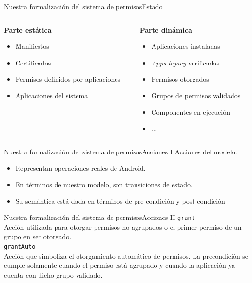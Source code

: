 \documentclass[pdf, handout]{beamer} %
\begin{document}
\begin{frame}{Nuestra formalización del sistema de permisos}{Estado}
    \begin{columns}[T]
        \begin{column}{.45\textwidth}
            \textbf{Parte estática}
            \begin{itemize}
                \item Manifiestos
                \item Certificados
                \item Permisos definidos por aplicaciones
                \item Aplicaciones del sistema
            \end{itemize}
        \end{column}
        \pause
        \begin{column}{.55\textwidth}
            \textbf{Parte dinámica}
            \begin{itemize}
                \item Aplicaciones instaladas
                \item \textit{Apps legacy} verificadas
                \item Permisos otorgados
                \item Grupos de permisos validados
                \item Componentes en ejecución
                \item ...
            \end{itemize}
        \end{column}
    \end{columns}
\end{frame}

\begin{frame}{Nuestra formalización del sistema de permisos}{Acciones I}
    Acciones del modelo:
    \begin{itemize}[<+->]
        \item Representan operaciones reales de Android.
        \item En términos de nuestro modelo, son transiciones de estado.
        \item Su semántica está dada en términos de pre-condición y post-condición
    \end{itemize}
\end{frame}

\begin{frame}{Nuestra formalización del sistema de permisos}{Acciones II}
    \texttt{grant}\\
    \vspace{5px}
    Acción utilizada para otorgar permisos no agrupados o el primer permiso de un grupo en ser
    otorgado.\\
    \pause
    \vspace{10px}
    \texttt{grantAuto}\\
    \vspace{5px}
    Acción que simboliza el otorgamiento automático de permisos. La precondición se cumple solamente
    cuando el permiso está agrupado y cuando la aplicación ya cuenta con dicho grupo validado.
\end{frame}
\end{document}

